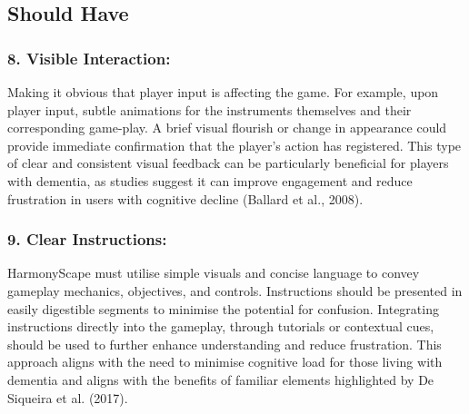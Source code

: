 \documentclass{l4proj}
\begin{document}
\subsection{Should Have}
\subsubsection{8. Visible Interaction:} Making it obvious that player input is affecting the game. For example, upon player input, subtle animations for the instruments themselves and their corresponding game-play. A brief visual flourish or change in appearance could provide immediate confirmation that the player's action has registered. This type of clear and consistent visual feedback can be particularly beneficial for players with dementia, as studies suggest it can improve engagement and reduce frustration in users with cognitive decline (Ballard et al., 2008).

\subsubsection{9. Clear Instructions:} HarmonyScape must utilise simple visuals and concise language to convey gameplay mechanics, objectives, and controls. Instructions should be presented in easily digestible segments to minimise the potential for confusion. Integrating instructions directly into the gameplay, through tutorials or contextual cues, should be used to further enhance understanding and reduce frustration. This approach aligns with the need to minimise cognitive load for those living with dementia and aligns with the benefits of familiar elements highlighted by De Siqueira et al. (2017).


\newpage
\end{document}
